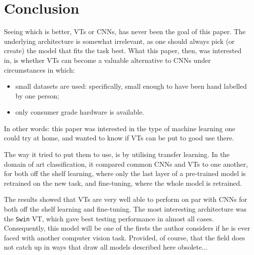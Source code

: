 \section{Conclusion}


Seeing which is better, VTs or CNNs, has never been the goal of this paper. The underlying architecture is somewhat irrelevant, as one should always pick (or create) the model that fits the task best. What this paper, then, was interested in, is whether VTs can become a valuable alternative to CNNs under circumstances in which:
\begin{itemize}
\item small datasets are used: specifically, small enough to have been hand labelled by one person;
\item only consumer grade hardware is available.
\end{itemize}
In other words: this paper was interested in the type of machine learning one could try at home, and wanted to know if VTs can be put to good use there.

The way it tried to put them to use, is by utilising transfer learning. In the domain of art classification, it compared common CNNs and VTs to one another, for both off the shelf learning, where only the last layer of a pre-trained model is retrained on the new task, and fine-tuning, where the whole model is retrained.

The results showed that VTs are very well able to perform on par with CNNs for both off the shelf learning and fine-tuning. The most interesting architecture was the \texttt{Swin} VT, which gave best testing performance in almost all cases. Consequently, this model will be one of the firsts the author considers if he is ever faced with another computer vision task. Provided, of course, that the field does not catch up in ways that draw all models described here obsolete...

